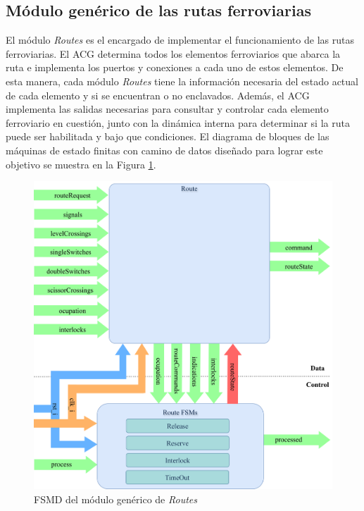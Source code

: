 \subsection{Módulo genérico de las rutas ferroviarias}

El módulo \textit{Routes} es el encargado de implementar el funcionamiento de las rutas ferroviarias. El ACG determina todos los elementos ferroviarios que abarca la ruta e implementa los puertos y conexiones a cada uno de estos elementos. De esta manera, cada módulo \textit{Routes} tiene la información necesaria del estado actual de cada elemento y si se encuentran o no enclavados. Además, el ACG implementa las salidas necesarias para consultar y controlar cada elemento ferroviario en cuestión, junto con la dinámica interna para determinar si la ruta puede ser habilitada y bajo que condiciones. El diagrama de bloques de las máquinas de estado finitas con camino de datos diseñado para lograr este objetivo se muestra en la Figura \ref{fig:RTS_module}.

\begin{figure}[H]
	\centering
	\includegraphics[width=1\textwidth]{Figuras/RTS_module}
	\centering\caption{FSMD del módulo genérico de \textit{Routes}}
	\label{fig:RTS_module}
\end{figure}

